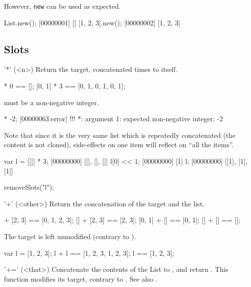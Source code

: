 However, \lstinline|new| can be used as expected.

\begin{urbiscript}
List.new();
[00000001] []
[1, 2, 3].new();
[00000002] [1, 2, 3]
\end{urbiscript}

\subsection{Slots}

\begin{urbiscriptapi}
\item['*'](<n>)%
  Return the target, concatenated  times to itself.
\begin{urbiassert}
[0, 1] * 0 == [];
[0, 1] * 3 == [0, 1, 0, 1, 0, 1];
\end{urbiassert}

   must be a non-negative integer.

\begin{urbiscript}
[0, 1] * -2;
[00000063:error] !!! *: argument 1: expected non-negative integer: -2
\end{urbiscript}


  Note that since it is the very same list which is repeatedly
  concatenated (the content is not cloned), side-effects on one item
  will reflect on ``all the items''.

\begin{urbiscript}
var l = [[]] * 3;
[00000000] [[], [], []]
l[0] << 1;
[00000000] [1]
l;
[00000000] [[1], [1], [1]]
\end{urbiscript}
\begin{urbicomment}
removeSlots("l");
\end{urbicomment}


\item['+'](<other>)%
  Return the concatenation of the target and the  list.

\begin{urbiassert}
[0, 1] + [2, 3] == [0, 1, 2, 3];
    [] + [2, 3] == [2, 3];
[0, 1] + []     == [0, 1];
    [] + []     == [];
\end{urbiassert}

The target is left unmodified (contrary to ).
\begin{urbiassert}
var l = [1, 2, 3];
l + l == [1, 2, 3, 1, 2, 3];
l     == [1, 2, 3];
\end{urbiassert}


\item['+='](<that>)%
  Concatenate the contents of the List  to \this, and return
  \this.  This function modifies its target, contrary to .  See
  also .


\end{urbiscriptapi}
